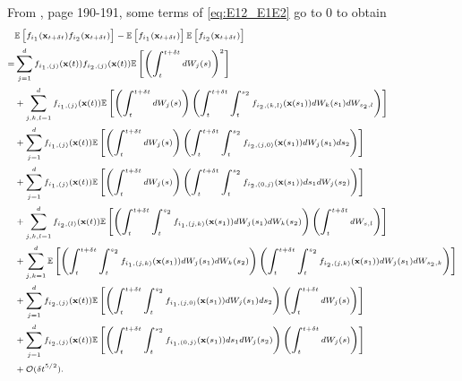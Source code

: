 %
From \cite{kloeden1992numerical}, page 190-191, some terms of \eqref{eq:E12_E1E2} go to 0 to obtain
%
\begin{equation}
\scriptsize
\begin{aligned}
&\mathbb{E} \left[ f_{i_1}(\mathbf{x}_{t + \delta t}) f_{i_2}(\mathbf{x}_{t + \delta t}) \right]
- \mathbb{E} \left[ f_{i_1}(\mathbf{x}_{t + \delta t}) \right] \mathbb{E} \left[ f_{i_2}(\mathbf{x}_{t + \delta t}) \right] \\
=&
 \sum_{j=1}^d f_{{i_1},(j)}(\mathbf{x}(t)) f_{{i_2},(j)}(\mathbf{x}(t)) \mathbb{E} \left[ \left( \int_t^{t + \delta t} dW_j(s) \right)^2 \right] \\
&+ \sum_{j,k,l=1}^d f_{{i_1},(j)}(\mathbf{x}(t)) \mathbb{E} \left[ \left( \int_t^{t + \delta t} dW_j(s) \right) \left( \int_t^{t+\delta t} \int_t^{s_2} f_{{i_2},(k,l)}(\mathbf{x}(s_1)) dW_k(s_1) dW_{s_2, l} \right) \right] \\
&+ \sum_{j=1}^d f_{{i_1},(j)}(\mathbf{x}(t)) \mathbb{E} \left[ \left( \int_t^{t + \delta t} dW_j(s) \right)\left( \int_t^{t+\delta t} \int_t^{s_2} f_{{i_2},(j,0)}(\mathbf{x}(s_1)) dW_j(s_1) ds_2 \right) \right]\\
&+ \sum_{j=1}^d f_{{i_1},(j)}(\mathbf{x}(t)) \mathbb{E} \left[ \left( \int_t^{t + \delta t} dW_j(s) \right) \left( \int_t^{t+\delta t} \int_t^{s_2} f_{{i_2},(0,j)}(\mathbf{x}(s_1)) ds_1 dW_j(s_2) \right) \right] \\
&+  \sum_{j, k, l=1}^d  f_{{i_2},(l)}(\mathbf{x}(t))\mathbb{E} \left[ \left( \int_t^{t+\delta t} \int_t^{s_2} f_{{i_1},(j,k)}(\mathbf{x}(s_1)) dW_j(s_1) dW_k(s_2) \right) \left( \int_t^{t + \delta t} dW_{s,l} \right) \right] \\
&+ \sum_{j, k=1}^d \mathbb{E} \left[ \left( \int_t^{t+\delta t} \int_t^{s_2} f_{{i_1},(j,k)}(\mathbf{x}(s_1)) dW_j(s_1) dW_k(s_2) \right) \left( \int_t^{t+\delta t} \int_t^{s_2} f_{{i_2},(j,k)}(\mathbf{x}(s_1)) dW_j(s_1) dW_{s_2,k} \right) \right] \\
&+  \sum_{j=1}^d f_{{i_2},(j)}(\mathbf{x}(t)) \mathbb{E} \left[ \left( \int_t^{t+\delta t} \int_t^{s_2} f_{{i_1},(j,0)}(\mathbf{x}(s_1)) dW_j(s_1) ds_2  \right) \left( \int_t^{t + \delta t} dW_j(s) \right) \right]\\
&+   \sum_{j=1}^d  f_{{i_2},(j)}(\mathbf{x}(t)) \mathbb{E} \left[ \left( \int_t^{t+\delta t} \int_t^{s_2} f_{{i_1},(0,j)}(\mathbf{x}(s_1)) ds_1 dW_j(s_2)  \right) \left(\int_t^{t + \delta t} dW_j(s) \right) \right] \\
&+ \mathcal{O} (\delta t^{5/2}) .
\end{aligned}
\end{equation}
